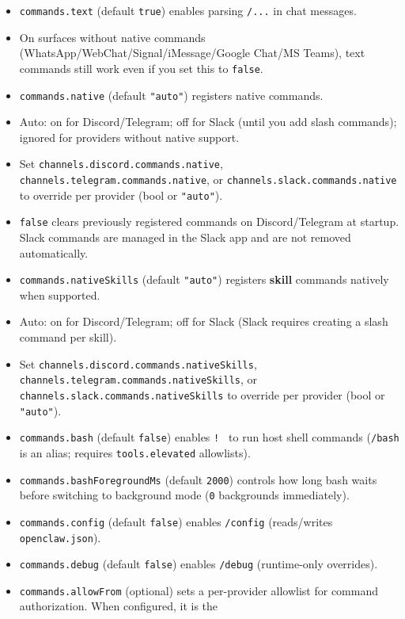 \begin{itemize}
  \item \texttt{commands.text} (default \texttt{true}) enables parsing \texttt{/...} in chat messages.
  \item On surfaces without native commands (WhatsApp/WebChat/Signal/iMessage/Google Chat/MS Teams), text commands still work even if you set this to \texttt{false}.
  \item \texttt{commands.native} (default \texttt{"auto"}) registers native commands.
  \item Auto: on for Discord/Telegram; off for Slack (until you add slash commands); ignored for providers without native support.
  \item Set \texttt{channels.discord.commands.native}, \texttt{channels.telegram.commands.native}, or \texttt{channels.slack.commands.native} to override per provider (bool or \texttt{"auto"}).
  \item \texttt{false} clears previously registered commands on Discord/Telegram at startup. Slack commands are managed in the Slack app and are not removed automatically.
  \item \texttt{commands.nativeSkills} (default \texttt{"auto"}) registers \textbf{skill} commands natively when supported.
  \item Auto: on for Discord/Telegram; off for Slack (Slack requires creating a slash command per skill).
  \item Set \texttt{channels.discord.commands.nativeSkills}, \texttt{channels.telegram.commands.nativeSkills}, or \texttt{channels.slack.commands.nativeSkills} to override per provider (bool or \texttt{"auto"}).
  \item \texttt{commands.bash} (default \texttt{false}) enables \texttt{! } to run host shell commands (\texttt{/bash } is an alias; requires \texttt{tools.elevated} allowlists).
  \item \texttt{commands.bashForegroundMs} (default \texttt{2000}) controls how long bash waits before switching to background mode (\texttt{0} backgrounds immediately).
  \item \texttt{commands.config} (default \texttt{false}) enables \texttt{/config} (reads/writes \texttt{openclaw.json}).
  \item \texttt{commands.debug} (default \texttt{false}) enables \texttt{/debug} (runtime-only overrides).
  \item \texttt{commands.allowFrom} (optional) sets a per-provider allowlist for command authorization. When configured, it is the
\end{itemize}

